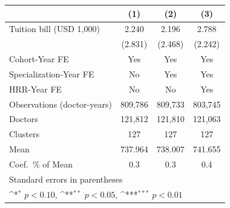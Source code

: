 {
\def\sym#1{\ifmmode^{#1}\else\(^{#1}\)\fi}
\begin{tabular}{l*{3}{c}}
\hline\hline
                    &\multicolumn{1}{c}{(1)}         &\multicolumn{1}{c}{(2)}         &\multicolumn{1}{c}{(3)}         \\
\hline
Tuition bill (USD 1,000)&       2.240         &       2.196         &       2.788         \\
                    &     (2.831)         &     (2.468)         &     (2.242)         \\
[1em]
Cohort-Year FE      &         Yes         &         Yes         &         Yes         \\
[1em]
Specialization-Year FE&          No         &         Yes         &         Yes         \\
[1em]
HRR-Year FE         &          No         &          No         &         Yes         \\
\hline
Observations (doctor-years)&     809,786         &     809,733         &     803,745         \\
Doctors             &     121,812         &     121,810         &     121,063         \\
Clusters            &         127         &         127         &         127         \\
Mean                &     737.964         &     738.007         &     741.655         \\
Coef.\ \% of Mean   &         0.3         &         0.3         &         0.4         \\
\hline\hline
\multicolumn{4}{l}{\footnotesize Standard errors in parentheses}\\
\multicolumn{4}{l}{\footnotesize \sym{*} \(p<0.10\), \sym{**} \(p<0.05\), \sym{***} \(p<0.01\)}\\
\end{tabular}
}
